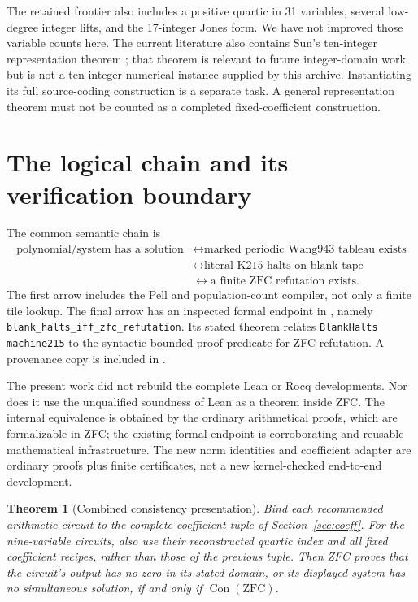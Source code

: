 \documentclass[11pt]{article}
\newtheorem{theorem}{Theorem}[section]
\newcommand{\Con}{\operatorname{Con}}
\begin{document}
The retained frontier also includes a positive quartic in 31 variables, several
low-degree integer lifts, and the 17-integer Jones form. We have not improved
those variable counts here. The current literature also contains Sun's
ten-integer representation theorem \cite{sun}; that theorem is relevant to
future integer-domain work but is not a ten-integer numerical instance supplied
by this archive. Instantiating its full source-coding construction is a separate
task. A general representation theorem must not be counted as a completed
fixed-coefficient construction.

\section{The logical chain and its verification boundary}

The common semantic chain is
\[
 \begin{split}
 \text{polynomial/system has a solution}
 &\longleftrightarrow \text{marked periodic Wang943 tableau exists}\\
 &\longleftrightarrow \text{literal K215 halts on blank tape}\\
 &\longleftrightarrow \text{a finite ZFC refutation exists}.
 \end{split}
\]
The first arrow includes the Pell and population-count compiler, not only a
finite tile lookup. The final arrow has an inspected formal endpoint in
, namely
\texttt{blank\_halts\_iff\_zfc\_refutation}. Its stated theorem relates
\texttt{BlankHalts machine215} to the syntactic bounded-proof predicate for
ZFC refutation. A provenance copy is included in .

The present work did not rebuild the complete Lean or Rocq developments.
Nor does it use the unqualified soundness of Lean as a theorem inside ZFC.
The internal equivalence is obtained by the ordinary arithmetical proofs,
which are formalizable in ZFC; the existing formal endpoint is corroborating
and reusable mathematical infrastructure. The new norm identities and
coefficient adapter are ordinary proofs plus finite certificates, not a new
kernel-checked end-to-end development.

\begin{theorem}[Combined consistency presentation]\label{thm:main}
Bind each recommended arithmetic circuit to the complete coefficient tuple of
Section~\ref{sec:coeff}. For the nine-variable circuits, also use their
reconstructed quartic index and all fixed coefficient recipes, rather than
those of the previous tuple. Then ZFC proves that the circuit's output has no
zero in its stated domain, or its displayed system has no simultaneous
solution, if and only if $\Con(\mathrm{ZFC})$.
\end{theorem}
\end{document}
